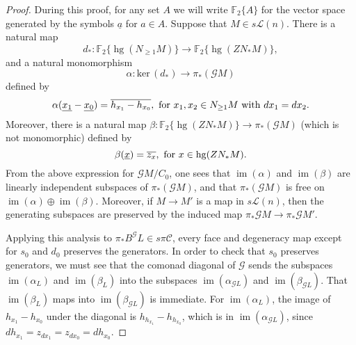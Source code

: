 \documentclass[11pt]{amsart} \renewcommand{\baselinestretch}{1.2}
\theoremstyle{plain}
\numberwithin{equation}{section} %
\theoremstyle{plain}
\numberwithin{equation}{chapter} %
\renewcommand{\ker}{\mathrm{ker}\,}
\DeclareMathOperator{\im}{im}
\DeclareMathOperator{\homog}{hg}
\renewcommand{\to}{\longrightarrow}
\newcommand{\scrG}{\mathscr{G}}
\newcommand{\calL}{\mathcal{L}}
\newcommand{\calc}{\mathcal{C}}
\newcommand{\BSW}{{\scrG}}
\newcommand{\PA}[1]{\pi#1}
\newcommand{\F}{\mathbb{F}}
\newcommand{\Ftwo}{\F_2}
\begin{document}
\begin{Comp funct sseqs}
\begin{proof}
During this proof, for any set $A$ we will write $\Ftwo \{A\}$ for the vector space generated by the symbols $\underline{a}$ for $a\in A$. Suppose that $M\in s\calL(n)$. There is a natural map \[d_*:\Ftwo \{\homog( N_{\geq1}M)\} \to \Ftwo \{\homog( ZN_*M)\} ,\] and a natural monomorphism \[\alpha:\ker(d_*)\to \pi_*(\BSW M)\] defined by
\[\alpha(\underline{x_1}-\underline{x_0})=\overline{h_{x_1}-h_{x_0}},\textup{ for $x_1,x_2\in N_{\geq1}M$ with $dx_1=dx_2$}.\]
Moreover, there is a natural map $\beta:\Ftwo \{\homog( ZN_*M)\}\to\pi_*(\BSW M)$ (which is not monomorphic) defined by
\[\beta(\underline{x})=\overline{z_{x}},\textup{ for $x\in \homog( ZN_*M)$}.\]
From the above expression for $\BSW M/C_0$, one sees that $\im (\alpha)$ and $\im (\beta)$ are linearly independent subspaces of $\pi_*(\BSW M)$, and that $\pi_*(\BSW M)$ is free on $\im (\alpha)\oplus\im (\beta)$. Moreover, if $M\to M'$ is a map in $s\calL(n)$, then the generating subspaces are preserved by the induced map $\pi_*\BSW M\to \pi_*\BSW M'$.

Applying this analysis to $\pi_*B^\BSW L\in s\PA{\calc}$, every face and degeneracy map except for $s_0$ and $d_0$ preserves the generators.
In order to check that $s_0$ preserves generators, we must see that the comonad diagonal of $\BSW$ sends the subspaces $\im (\alpha_L)$ and $\im (\beta_L)$ into the subspaces $\im (\alpha_{\BSW L})$ and $\im (\beta_{\BSW L})$. That $\im (\beta_L)$ maps into $\im (\beta_{\BSW L})$ is immediate. For $\im (\alpha_L)$, the image of $h_{x_1}-h_{x_0}$ under the diagonal is $h_{h_{x_1}}-h_{h_{x_0}}$, which is in $\im(\alpha_{\BSW L})$, since $dh_{x_1}=z_{dx_1}=z_{dx_0}=dh_{x_0}$.
\end{proof}




\end{Comp funct sseqs}
\end{document}
